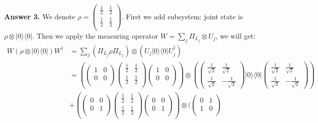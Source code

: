\documentclass[11pt]{article}
\begin{document}
{\bf Answer 3.} We denote $\rho=\begin{pmatrix}
	\frac{1}{2}&\frac{1}{2}\\
	\frac{1}{2}&\frac{1}{2}\\
\end{pmatrix}$. First we add subsystem: joint state is $\rho\otimes|0\rangle\langle0|$. Then we apply the measuring operator $W=\sum_j\Pi_{L_j}\otimes U_j$, we will get:
$$
\begin{aligned}
W(\rho\otimes|0\rangle\langle0|)W^{\dag}&=\sum_j(\Pi_{L_j}\rho\Pi_{L_j})\otimes(U_j|0\rangle\langle0|U_j^{\dag})\\
&=(\begin{pmatrix}
	1&0\\
	0&0\\
\end{pmatrix}\begin{pmatrix}
\frac{1}{2}&\frac{1}{2}\\
\frac{1}{2}&\frac{1}{2}\\
\end{pmatrix}\begin{pmatrix}
1&0\\
0&0\\
\end{pmatrix})\otimes(\begin{pmatrix}
\frac{1}{\sqrt{2}}&\frac{1}{\sqrt{2}}\\
\frac{1}{\sqrt{2}}&-\frac{1}{\sqrt{2}}
\end{pmatrix}|0\rangle\langle0|\begin{pmatrix}
\frac{1}{\sqrt{2}}&\frac{1}{\sqrt{2}}\\
\frac{1}{\sqrt{2}}&-\frac{1}{\sqrt{2}}
\end{pmatrix})\\
&+(\begin{pmatrix}
	0&0\\
	0&1\\
\end{pmatrix}\begin{pmatrix}
	\frac{1}{2}&\frac{1}{2}\\
	\frac{1}{2}&\frac{1}{2}\\
\end{pmatrix}\begin{pmatrix}
	0&0\\
	0&1\\
\end{pmatrix})\otimes(\begin{pmatrix}
0&1\\
1&0\\

\end{pmatrix}
\end{aligned}$$
\end{document}

